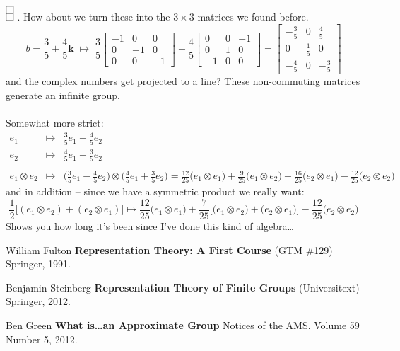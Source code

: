 \documentclass[12pt]{article}
\begin{document}
$\tikz{\begin{scope}[scale=0.25]\draw (0,0)--(1,0)--(1,1)--(0,1)--cycle;
\draw (0,1)--(1,1)--(1,2)--(0,2)--cycle;\end{scope}}$ .  How about we turn these into the $3 \times 3$ matrices we found before.
$$ b = \frac{3}{5} + \frac{4}{5}\mathbf{k}
\; \mapsto \;
\frac{3}{5}\left[ \begin{array}{rrr} -1 & 0 & 0 \\ 0 & -1 & 0 \\ 0 & 0 & -1\end{array}\right] 
+ 
\frac{4}{5}\left[ \begin{array}{rrr} 0 & 0 & -1 \\ 0 & 1 & 0 \\ -1 & 0 & 0\end{array}\right]
= \left[ \begin{array}{rrr} -\frac{3}{5} & 0 & \frac{4}{5} \\ 0 & \frac{1}{5} & 0 \\ -\frac{4}{5} & 0 & -\frac{3}{5}\end{array}\right]$$
and the complex numbers get projected to a line?  These non-commuting matrices generate an infinite group. \\ \\
Somewhat more strict:
\begin{eqnarray*}
e_1 &\mapsto& \tfrac{3}{5} e_1 - \tfrac{4}{5} e_2 \\
e_2 &\mapsto& \tfrac{4}{5} e_1 + \tfrac{3}{5} e_2 \\ \\
e_1 \otimes e_2 &\mapsto& \big(\tfrac{3}{5} e_1 - \tfrac{4}{5} e_2\big) \otimes 
\big( \tfrac{4}{5} e_1 + \tfrac{3}{5} e_2 \big)
= \frac{12}{25} \big( e_1 \otimes e_1 \big)+  
\frac{9}{25} \big( e_1 \otimes e_2 \big)-
\frac{16}{25} \big( e_2 \otimes e_1 \big)- \frac{12}{25} \big(e_2 \otimes e_2 \big)
\end{eqnarray*}
and in addition -- since we have a symmetric product we really want:
$$ 
\frac{1}{2}\big[(e_1 \otimes e_2) + (e_2 \otimes e_1)\big]
\mapsto \frac{12}{25} \big( e_1 \otimes e_1 \big)+  
\frac{7}{25} \big[ \big( e_1 \otimes e_2 \big) + \big( e_2 \otimes e_1 \big) \big]- \frac{12}{25} \big(e_2 \otimes e_2 \big) $$
Shows you how long it's been since I've done this kind of algebra\dots 
\vfill

\begin{thebibliography}{}

\item William Fulton \textbf{Representation Theory: A First Course} (GTM \#129) Springer, 1991.

\item Benjamin Steinberg \textbf{Representation Theory of Finite Groups} (Universitext) Springer, 2012.

\item Ben Green \textbf{What is\dots an Approximate Group} Notices of the AMS. Volume 59 Number 5, 2012.

\end{thebibliography}
\end{document}
